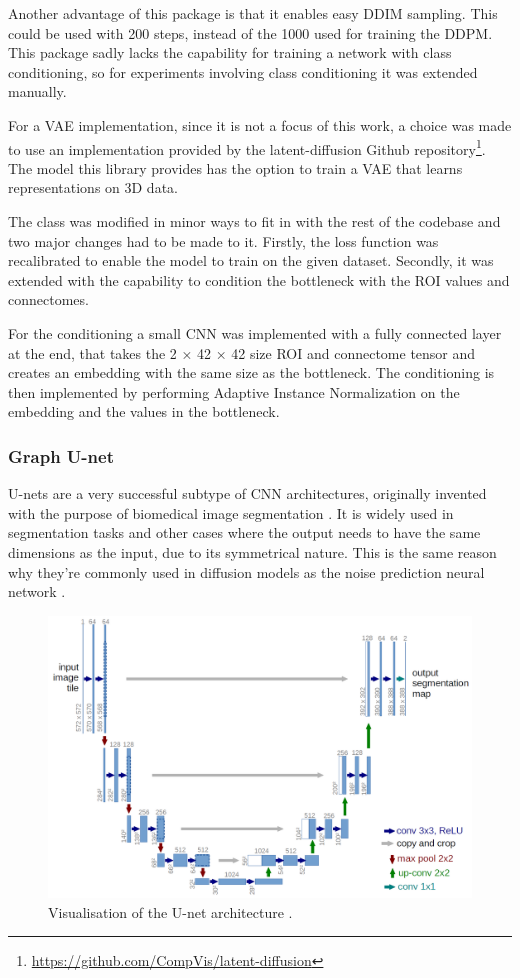 	Another advantage of this package is that it enables easy DDIM sampling. This could be used with 200 steps, instead of the 1000 used for training the DDPM. This package sadly lacks the capability for training a network with class conditioning, so for experiments involving class conditioning it was extended manually.
	
	For a VAE implementation, since it is not a focus of this work, a choice was made to use an implementation provided by the latent-diffusion Github repository\footnote{\url{https://github.com/CompVis/latent-diffusion}}. The model this library provides has the option to train a VAE that learns representations on 3D data. 
	
	The class was modified in minor ways to fit in with the rest of the codebase and  two major changes had to be made to it. Firstly,  the loss function was recalibrated to enable the model to train on the given dataset. Secondly, it was extended with the capability to condition the bottleneck with the ROI values and connectomes. 
	
	For the conditioning a small CNN was implemented with a fully connected layer at the end, that takes the 2 × 42 × 42 size ROI and connectome tensor and creates an embedding with the same size as the bottleneck. The conditioning is then implemented by performing Adaptive Instance Normalization \cite{huang2017arbitrary} on the embedding and the values in the bottleneck.
	
	\subsubsection{Graph U-net}
	
	U-nets are a very successful subtype of CNN architectures, originally invented with the purpose of biomedical image segmentation \cite{ronneberger2015u}. It is widely used in segmentation tasks and other cases where the output needs to have the same dimensions as the input, due to its symmetrical nature. This is the same reason why they're commonly used in diffusion models as the noise prediction neural network \cite{ho2020denoising}.
	
	\begin{figure}[!h]
		\centering		
		\includegraphics[width=\textwidth]{figures/u-net-architecture.png}
		\caption{Visualisation of the U-net architecture \cite{ronneberger2015u}.}
		\label{fig:unet}
	\end{figure}
	
